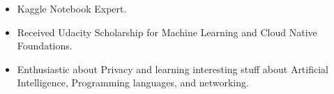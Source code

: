 



{\fontsize{11pt}{1em}\bodyfontlight\upshape\color{text}
\begin{itemize}
  \itemsep-0.3em
    \item Kaggle Notebook Expert.
    \item Received Udacity Scholarship for Machine Learning and Cloud Native Foundations.
    \item Enthusiastic about Privacy and learning interesting stuff about Artificial Intelligence, Programming languages, and networking.
\end{itemize}
}
